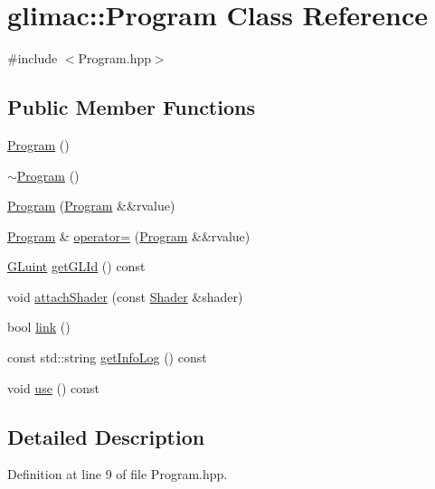 \hypertarget{classglimac_1_1_program}{}\section{glimac\+:\+:Program Class Reference}
\label{classglimac_1_1_program}


{\ttfamily \#include $<$Program.\+hpp$>$}

\subsection*{Public Member Functions}
\begin{DoxyCompactItemize}
\item 
\hyperlink{classglimac_1_1_program_ae364a0bdec2fee9c5d8a6bb617d1a4f4}{Program} ()
\item 
\hyperlink{classglimac_1_1_program_ad1b5de1578ad33a3b8ea127ca9f16b68}{$\sim$\+Program} ()
\item 
\hyperlink{classglimac_1_1_program_aad59ed1f53824eda09b95fd1acdce674}{Program} (\hyperlink{classglimac_1_1_program}{Program} \&\&rvalue)
\item 
\hyperlink{classglimac_1_1_program}{Program} \& \hyperlink{classglimac_1_1_program_a3ee1eac00a2e3fa4b6bab51d4333f33c}{operator=} (\hyperlink{classglimac_1_1_program}{Program} \&\&rvalue)
\item 
\hyperlink{dummy_8cpp_aa311c7f0d6ec4f1a33f9235c3651b86b}{G\+Luint} \hyperlink{classglimac_1_1_program_ab1a519d005c77ba44876d1f309b38d18}{get\+G\+L\+Id} () const
\item 
void \hyperlink{classglimac_1_1_program_a5aac165d28cd6f704c01a3e0eee2119d}{attach\+Shader} (const \hyperlink{classglimac_1_1_shader}{Shader} \&shader)
\item 
bool \hyperlink{classglimac_1_1_program_a2f32f4f66ff9742750418f6fda054931}{link} ()
\item 
const std\+::string \hyperlink{classglimac_1_1_program_aaf1769457ca41bca4afad7ecf90e9c3f}{get\+Info\+Log} () const
\item 
void \hyperlink{classglimac_1_1_program_a825cb4d58cccdf849730191ae5e118c6}{use} () const
\end{DoxyCompactItemize}


\subsection{Detailed Description}


Definition at line 9 of file Program.\+hpp.



